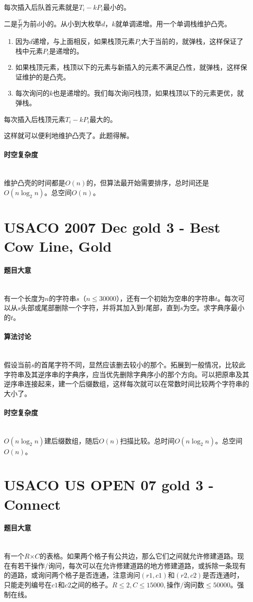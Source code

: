 \documentclass[UTF8]{ctexart}
\newcommand{\myparagraph}[1]{\paragraph{#1}\mbox{}\\}
\theoremstyle{nonumberplain}
\begin{document}
			每次插入后队首元素就是$T_i-k P_i$最小的。
			
			二是$\frac{T_i}{P_i}$为前$d$小的。从小到大枚举$d$，$k$就单调递增。用一个单调栈维护凸壳。
			
			\begin{enumerate}
				\item 因为$d$递增，与上面相反，如果栈顶元素$P_i$大于当前的，就弹栈，这样保证了栈中元素$P_i$是递增的。
				\item 如果栈顶元素，栈顶以下的元素与新插入的元素不满足凸性，就弹栈，这样保证维护的是凸壳。
				\item 每次询问的$k$也是递增的。我们每次询问栈顶，如果栈顶以下的元素更优，就弹栈。
			\end{enumerate}
			
			每次插入后栈顶元素$T_i-k P_i$最大的。
			
			这样就可以便利地维护凸壳了。此题得解。
		
		\myparagraph{时空复杂度}
		
			维护凸壳的时间都是$O(n)$的，但算法最开始需要排序，总时间还是$O(n\log_2n)$。总空间$O(n)$。
	
	\section{USACO 2007 Dec gold 3 - Best Cow Line, Gold}
	
		\myparagraph{题目大意}
		
			有一个长度为$n$的字符串$s$（$n \leq 30000$），还有一个初始为空串的字符串$t$。每次可以从$s$头部或尾部删除一个字符，并将其加入到$t$尾部，直到$s$为空。求字典序最小的$t$。
		
		\myparagraph{算法讨论}
		
			假设当前$s$的首尾字符不同，显然应该删去较小的那个。拓展到一般情况，比较此字符串及其逆序串的字典序，应当优先删除字典序小的那个方向。可以把原串及其逆序串连接起来，建一个后缀数组，这样每次就可以在常数时间比较两个字符串的大小了。
		
		\myparagraph{时空复杂度}
		
			$O(n\log_2n)$建后缀数组，随后$O(n)$扫描比较。总时间$O(n\log_2n)$。总空间$O(n)$。
	
	\section{USACO US OPEN 07 gold 3 - Connect}
	
		\myparagraph{题目大意}
		
			有一个$R$×$C$的表格。如果两个格子有公共边，那么它们之间就允许修建道路。现在有若干操作/询问，每次可以在允许修建道路的地方修建道路，或拆除一条现有的道路，或询问两个格子是否连通，注意询问$(r1,c1)$和$(r2,c2)$是否连通时，只能走列编号在$c1$和$c2$之间的格子。$R \leq 2, C \leq 15000, \mbox{操作/询问数} \leq 50000$。强制在线。
		
\end{document}
